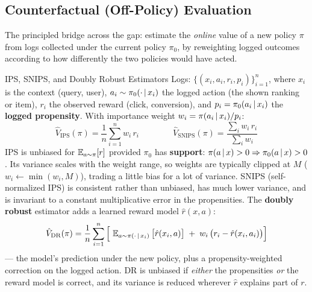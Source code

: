 \subsection{Counterfactual (Off-Policy) Evaluation}

The principled bridge across the gap: estimate the \textit{online} value of a new policy $\pi$ from logs collected under the current policy $\pi_0$, by reweighting logged outcomes according to how differently the two policies would have acted.

\begin{mathresult}{IPS, SNIPS, and Doubly Robust Estimators}
Logs: $\{(x_i, a_i, r_i, p_i)\}_{i=1}^{n}$, where $x_i$ is the context (query, user), $a_i \sim \pi_0(\cdot \,|\, x_i)$ the logged action (the shown ranking or item), $r_i$ the observed reward (click, conversion), and $p_i = \pi_0(a_i \,|\, x_i)$ the \textbf{logged propensity}. With importance weight $w_i = \pi(a_i \,|\, x_i)/p_i$:
\begin{equation}
\hat{V}_{\mathrm{IPS}}(\pi) = \frac{1}{n}\sum_{i=1}^{n} w_i\, r_i
\qquad\qquad
\hat{V}_{\mathrm{SNIPS}}(\pi) = \frac{\sum_i w_i\, r_i}{\sum_i w_i}
\label{sr:eq:ips}
\end{equation}
IPS is unbiased for $\operatorname{\mathbb{E}}_{a \sim \pi}[r]$ provided $\pi_0$ has \textbf{support}: $\pi(a \,|\, x) > 0 \Rightarrow \pi_0(a \,|\, x) > 0$. Its variance scales with the weight range, so weights are typically clipped at $M$ ($w_i \leftarrow \min(w_i, M)$), trading a little bias for a lot of variance. SNIPS (self-normalized IPS) is consistent rather than unbiased, has much lower variance, and is invariant to a constant multiplicative error in the propensities. The \textbf{doubly robust} estimator adds a learned reward model $\hat{r}(x, a)$:
\begin{equation}
\hat{V}_{\mathrm{DR}}(\pi) = \frac{1}{n}\sum_{i=1}^{n}\Big[\, \operatorname{\mathbb{E}}_{a \sim \pi(\cdot \,|\, x_i)}\big[\hat{r}(x_i, a)\big] \;+\; w_i\,\big(r_i - \hat{r}(x_i, a_i)\big) \Big]
\label{sr:eq:dr}
\end{equation}
--- the model's prediction under the new policy, plus a propensity-weighted correction on the logged action. DR is unbiased if \textit{either} the propensities \textit{or} the reward model is correct, and its variance is reduced wherever $\hat{r}$ explains part of $r$.
\end{mathresult}


